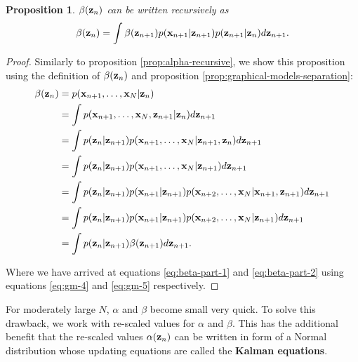 \documentclass[11pt]{article}
\numberwithin{equation}{section}
\newcommand{\x}{{\bf x}}
\newcommand{\z}{{\bf z}}
\newtheorem{proposition}{Proposition}[section]
\begin{document}
\begin{proposition} \label{prop:beta-recursive}
	$\beta(\z_n)$ can be written recursively as
	\begin{equation}
		\beta(\z_n) = \int  \beta(\z_{n+1})p(\x_{n+1}\vert \z_{n+1}) p(\z_{n+1}\vert \z_n) d\z_{n+1}.
	\end{equation} 
\end{proposition}

\begin{proof}
	Similarly to proposition \ref{prop:alpha-recursive}, we show this proposition using the definition of $\beta(\z_n)$ and proposition \ref{prop:graphical-models-separation}:
	\begin{align}
		\beta(\z_n) &= p(\x_{n+1}, \ldots, \x_N \vert \z_n)\\
		&= \int p(\x_{n+1}, \ldots, \x_N, \z_{n+1} \vert \z_n) d\z_{n+1} \\
		&= \int p(\z_n \vert \z_{n+1}) p(\x_{n+1}, \ldots, \x_N \vert \z_{n+1}, \z_n) d\z_{n+1} \\
		&= \int p(\z_n \vert \z_{n+1}) p(\x_{n+1}, \ldots, \x_N \vert \z_{n+1}) d\z_{n+1} \label{eq:beta-part-1} \\
		&= \int p(\z_n \vert \z_{n+1}) p(\x_{n+1} \vert \z_{n+1}) p(\x_{n+2}, \ldots, \x_N \vert \x_{n+1}, \z_{n+1}) d\z_{n+1} \\
		&= \int p(\z_n \vert \z_{n+1}) p(\x_{n+1} \vert \z_{n+1}) p(\x_{n+2}, \ldots, \x_N \vert \z_{n+1}) d\z_{n+1} \label{eq:beta-part-2}\\
		&= \int p(\z_n \vert \z_{n+1}) \beta(\z_{n+1}) d\z_{n+1}.
	\end{align}
	
	Where we have arrived at equations \eqref{eq:beta-part-1} and \eqref{eq:beta-part-2} using equations \eqref{eq:gm-4} and \eqref{eq:gm-5} respectively.
\end{proof}

For moderately large $N$, $\alpha$ and $\beta$ become small very quick. To solve this drawback, we work with re-scaled values for $\alpha$ and $\beta$. This has the additional benefit that the re-scaled values $\alpha(\z_n)$ can be written in form of a Normal distribution whose updating equations are  called the \textbf{Kalman equations}.

\end{document}
